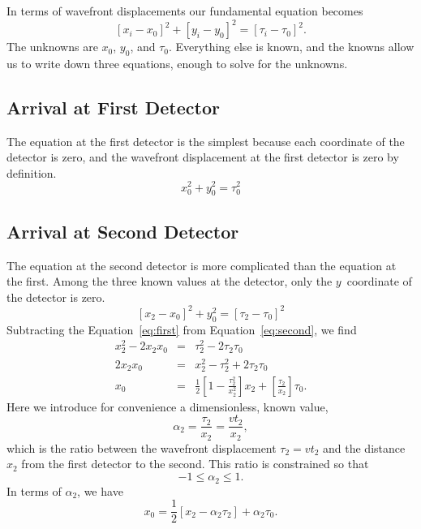 \documentclass[twocolumn]{article}
\begin{document}
In terms of wavefront displacements our fundamental equation becomes
\begin{equation}
   \left[x_i - x_0\right]^2 + \left[y_i - y_0\right]^2 = \left[\tau_i -
   \tau_0\right]^2.
\end{equation}
The unknowns are $x_0$, $y_0$, and $\tau_0$. Everything else is known, and the
knowns allow us to write down three equations, enough to solve for the
unknowns.

\subsection{Arrival at First Detector}

The equation at the first detector is the simplest because each coordinate of
the detector is zero, and the wavefront displacement at the first detector is
zero by definition.
\begin{equation}
   x_0^2 + y_0^2 = \tau_0^2
   \label{eq:first}
\end{equation}

\subsection{Arrival at Second Detector}

The equation at the second detector is more complicated than the equation at
the first.  Among the three known values at the detector, only the
$y$~coordinate of the detector is zero.
\begin{equation}
   \left[x_2 - x_0\right]^2 + y_0^2 = \left[\tau_2 - \tau_0\right]^2
   \label{eq:second}
\end{equation}
Subtracting the Equation~\ref{eq:first} from Equation~\ref{eq:second}, we find
\begin{eqnarray}
   \nonumber
   x_2^2 - 2 x_2 x_0 &=& \tau_2^2 - 2 \tau_2 \tau_0\\
   \nonumber
   2 x_2 x_0 &=& x_2^2 - \tau_2^2 + 2 \tau_2 \tau_0\\
   x_0 &=& \frac{1}{2}\left[1 - \frac{\tau_2^2}{x_2^2}\right] x_2 +
           \left[\frac{\tau_2}{x_2}\right] \tau_0.
\end{eqnarray}
Here we introduce for convenience a dimensionless, known value,
\begin{equation}
   \alpha_2 = \frac{\tau_2}{x_2} = \frac{v t_2}{x_2},
\end{equation}
which is the ratio between the wavefront displacement $\tau_2 = vt_2$ and the
distance $x_2$ from the first detector to the second.  This ratio is constrained
so that
\begin{equation}
   -1 \leq \alpha_2 \leq 1.
\end{equation}
In terms of $\alpha_2$, we have
\begin{equation}
   x_0 = \frac{1}{2}\left[x_2 - \alpha_2\tau_2\right] + \alpha_2\tau_0.
   \label{eq:t-x}
\end{equation}
\end{document}
